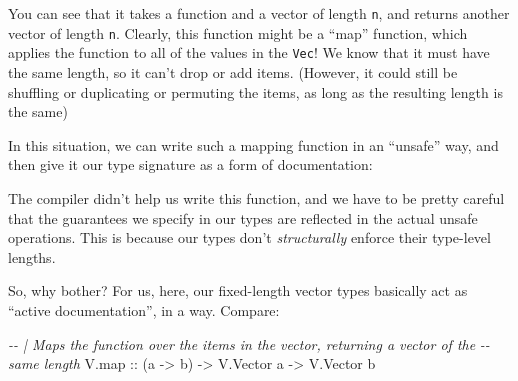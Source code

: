 \documentclass[]{article}
\newenvironment{Shaded}{}{}
\newcommand{\CommentTok}[1]{\textcolor[rgb]{0.38,0.63,0.69}{\textit{#1}}}
\newcommand{\DataTypeTok}[1]{\textcolor[rgb]{0.56,0.13,0.00}{#1}}
\newcommand{\FunctionTok}[1]{\textcolor[rgb]{0.02,0.16,0.49}{#1}}
\newcommand{\KeywordTok}[1]{\textcolor[rgb]{0.00,0.44,0.13}{\textbf{#1}}}
\newcommand{\NormalTok}[1]{#1}
\newcommand{\OperatorTok}[1]{\textcolor[rgb]{0.40,0.40,0.40}{#1}}
\newcommand{\OtherTok}[1]{\textcolor[rgb]{0.00,0.44,0.13}{#1}}
\begin{document}
You can see that it takes a function and a vector of length \texttt{n}, and
returns another vector of length \texttt{n}. Clearly, this function might be a
``map'' function, which applies the function to all of the values in the
\texttt{Vec}! We know that it must have the same length, so it can't drop or add
items. (However, it could still be shuffling or duplicating or permuting the
items, as long as the resulting length is the same)

In this situation, we can write such a mapping function in an ``unsafe'' way,
and then give it our type signature as a form of documentation:

\begin{Shaded}
\end{Shaded}

The compiler didn't help us write this function, and we have to be pretty
careful that the guarantees we specify in our types are reflected in the actual
unsafe operations. This is because our types don't \emph{structurally} enforce
their type-level lengths.

So, why bother? For us, here, our fixed-length vector types basically act as
``active documentation'', in a way. Compare:

\begin{Shaded}
\begin{Highlighting}[]
\CommentTok{{-}{-} | Maps the function over the items in the vector, returning a vector of the}
\CommentTok{{-}{-} same length}
\NormalTok{V.map}\OtherTok{ ::}\NormalTok{ (a }\OtherTok{{-}\textgreater{}}\NormalTok{ b) }\OtherTok{{-}\textgreater{}} \DataTypeTok{V.Vector}\NormalTok{ a }\OtherTok{{-}\textgreater{}} \DataTypeTok{V.Vector}\NormalTok{ b}
\end{Highlighting}
\end{Shaded}
\end{document}
